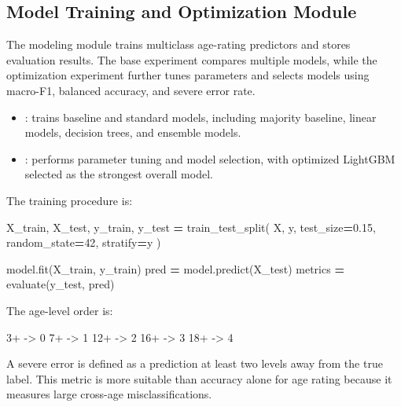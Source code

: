 \documentclass[UTF8,a4paper,12pt]{ctexart}
\newenvironment{Shaded}{\begin{snugshade}}{\end{snugshade}}
\newcommand{\DecValTok}[1]{\textcolor[rgb]{0.00,0.00,0.81}{#1}}
\newcommand{\FloatTok}[1]{\textcolor[rgb]{0.00,0.00,0.81}{#1}}
\newcommand{\NormalTok}[1]{#1}
\newcommand{\OperatorTok}[1]{\textcolor[rgb]{0.81,0.36,0.00}{\textbf{#1}}}
\renewenvironment{Shaded}{%
    \vspace{0.35em}%
    \begin{tcolorbox}[enhanced,breakable,colback=zjucodebg,colframe=zjucodeframe,boxrule=0.45pt,leftrule=2.2pt,arc=1.6mm,left=1.8mm,right=1.8mm,top=1.2mm,bottom=1.2mm]%
  }{%
    \end{tcolorbox}%
    \vspace{0.25em}%
  }%
\providecommand{\tightlist}{%
  \setlength{\itemsep}{0pt}\setlength{\parskip}{0pt}}
\begin{document}
\subsection{Model Training and Optimization Module}\label{model-training-and-optimization-module}

The modeling module trains multiclass age-rating predictors and stores evaluation results. The base experiment compares multiple models, while the optimization experiment further tunes parameters and selects models using macro-F1, balanced accuracy, and severe error rate.

\begin{itemize}
\tightlist
\item
  : trains baseline and standard models, including majority baseline, linear models, decision trees, and ensemble models.
\item
  : performs parameter tuning and model selection, with optimized LightGBM selected as the strongest overall model.
\end{itemize}

The training procedure is:

\begin{Shaded}
\begin{Highlighting}[]
\NormalTok{X\_train, X\_test, y\_train, y\_test }\OperatorTok{=}\NormalTok{ train\_test\_split(}
\NormalTok{    X, y, test\_size}\OperatorTok{=}\FloatTok{0.15}\NormalTok{, random\_state}\OperatorTok{=}\DecValTok{42}\NormalTok{, stratify}\OperatorTok{=}\NormalTok{y}
\NormalTok{)}

\NormalTok{model.fit(X\_train, y\_train)}
\NormalTok{pred }\OperatorTok{=}\NormalTok{ model.predict(X\_test)}
\NormalTok{metrics }\OperatorTok{=}\NormalTok{ evaluate(y\_test, pred)}
\end{Highlighting}
\end{Shaded}

The age-level order is:

\begin{Shaded}
\begin{Highlighting}[]
\NormalTok{3+ {-}\textgreater{} 0}
\NormalTok{7+ {-}\textgreater{} 1}
\NormalTok{12+ {-}\textgreater{} 2}
\NormalTok{16+ {-}\textgreater{} 3}
\NormalTok{18+ {-}\textgreater{} 4}
\end{Highlighting}
\end{Shaded}

A severe error is defined as a prediction at least two levels away from the true label. This metric is more suitable than accuracy alone for age rating because it measures large cross-age misclassifications.
\end{document}
